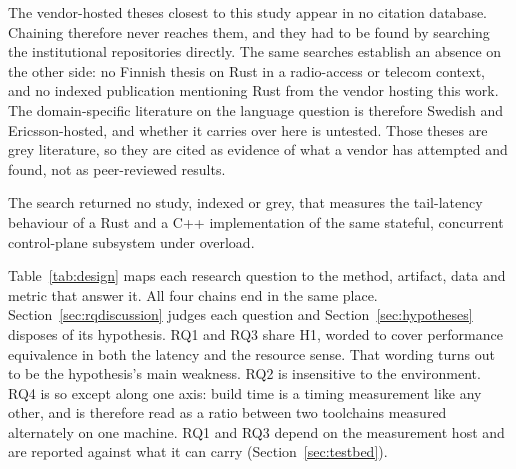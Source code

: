 \documentclass[english,oneside,a4paper,censored,csm,software-track-2020]{HYthesisML}
\begin{document}
The vendor-hosted theses closest to this study appear in no
citation database. Chaining therefore never reaches them, and they had to be found by searching
the institutional repositories directly. The same searches establish an absence on the other
side: no Finnish thesis on Rust in a radio-access or telecom context, and no indexed publication
mentioning Rust from the vendor hosting this work. The domain-specific literature on the
language question is therefore Swedish and Ericsson-hosted, and whether it carries over here is
untested. Those theses are grey literature, so they are cited as evidence of what a vendor has
attempted and found, not as peer-reviewed results.

The search returned no study, indexed or grey, that measures the tail-latency behaviour of a
Rust and a C++ implementation of the same stateful, concurrent control-plane subsystem under
overload.

Table~\ref{tab:design} maps each research question to the method, artifact, data and metric
that answer it. All four chains end in the same place. Section~\ref{sec:rqdiscussion} judges
each question and Section~\ref{sec:hypotheses} disposes of its hypothesis. RQ1 and RQ3 share
H1, worded to cover performance equivalence in both the latency and the resource sense. That
wording turns out to be the hypothesis's main weakness. RQ2 is insensitive to the
environment. RQ4 is so except along one axis: build time is a timing measurement like any
other, and is therefore read as a ratio between two toolchains measured alternately on one
machine. RQ1 and RQ3 depend on the measurement host and are reported against what it can carry
(Section~\ref{sec:testbed}).
\end{document}

